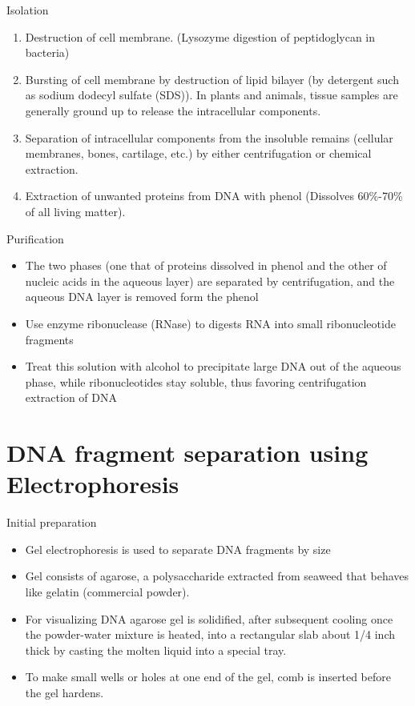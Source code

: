 \documentclass[
  ignorenonframetext,
  aspectratio=169]{beamer}
\providecommand{\tightlist}{%
  \setlength{\itemsep}{0pt}\setlength{\parskip}{0pt}}
\begin{document}
\begin{frame}{Isolation}
\protect\hypertarget{isolation}{}
\begin{enumerate}
\tightlist
\item
  Destruction of cell membrane. (Lysozyme digestion of peptidoglycan in
  bacteria)
\item
  Bursting of cell membrane by destruction of lipid bilayer (by
  detergent such as sodium dodecyl sulfate (SDS)). In plants and
  animals, tissue samples are generally ground up to release the
  intracellular components.
\item
  Separation of intracellular components from the insoluble remains
  (cellular membranes, bones, cartilage, etc.) by either centrifugation
  or chemical extraction.
\item
  Extraction of unwanted proteins from DNA with phenol (Dissolves
  60\%-70\% of all living matter).
\end{enumerate}
\end{frame}

\begin{frame}{Purification}
\protect\hypertarget{purification}{}
\begin{itemize}
\tightlist
\item
  The two phases (one that of proteins dissolved in phenol and the other
  of nucleic acids in the aqueous layer) are separated by
  centrifugation, and the aqueous DNA layer is removed form the phenol
\item
  Use enzyme ribonuclease (RNase) to digests RNA into small
  ribonucleotide fragments
\item
  Treat this solution with alcohol to precipitate large DNA out of the
  aqueous phase, while ribonucleotides stay soluble, thus favoring
  centrifugation extraction of DNA
\end{itemize}
\end{frame}

\hypertarget{dna-fragment-separation-using-electrophoresis}{%
\section{DNA fragment separation using
Electrophoresis}\label{dna-fragment-separation-using-electrophoresis}}

\begin{frame}{Initial preparation}
\protect\hypertarget{initial-preparation}{}
\begin{itemize}
\tightlist
\item
  Gel electrophoresis is used to separate DNA fragments by size
\item
  Gel consists of agarose, a polysaccharide extracted from seaweed that
  behaves like gelatin (commercial powder).
\item
  For visualizing DNA agarose gel is solidified, after subsequent
  cooling once the powder-water mixture is heated, into a rectangular
  slab about 1/4 inch thick by casting the molten liquid into a special
  tray.
\item
  To make small wells or holes at one end of the gel, comb is inserted
  before the gel hardens.
\end{itemize}
\end{frame}
\end{document}
